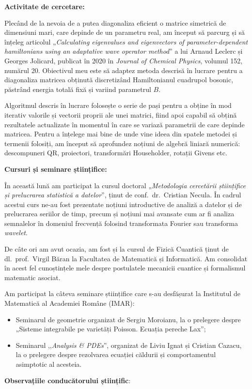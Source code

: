 
\makereportpreamble

\textbf{Activitate de cercetare:}

Plecând de la nevoia de a putea diagonaliza eficient o matrice simetrică de dimensiuni mari, care depinde de un parametru real, am început să parcurg și să înțeleg articolul „\emph{Calculating eigenvalues and eigenvectors of parameter-dependent hamiltonians using an adaptative wave operator method}” a lui Arnaud Leclerc și Georges Jolicard, publicat în 2020 în \emph{Journal of Chemical Physics}, volumul 152, numărul 20. Obiectivul meu este să adaptez metoda descrisă în lucrare pentru a diagonaliza matricea obținută discretizând Hamiltonianul cuadrupol bosonic, păstrând energia totală fixă și variind parametrul \(B\).

Algoritmul descris în lucrare folosește o serie de pași pentru a obține în mod iterativ valorile și vectorii proprii ale unei matrici, fiind apoi capabil să obțină rezultatele actualizate în momentul în care se variază parametrii de care depinde matricea. Pentru a înțelege mai bine de unde vine ideea din spatele metodei și termenii folosiți, am început să aprofundez noțiuni de algebră liniară numerică: descompuneri QR, proiectori, transformări Householder, rotații Givens etc.

\vspace{0.5em}

\textbf{Cursuri și seminare științifice:}

În această lună am participat la cursul doctoral „\emph{Metodologia cercetării științifice și prelucrarea statistică a datelor}”, ținut de conf.\ dr.\ Cristian Necula. În cadrul acestui curs ne-au fost prezentate noțiuni introductive de analiză a datelor și de prelucrarea seriilor de timp, precum și noțiuni mai avansate cum ar fi analiza semnalelor în domeniul frecvență folosind transformata Fourier sau transforma \emph{wavelet}.

De câte ori am avut ocazia, am fost și la cursul de Fizică Cuantică ținut de dl.\ prof.\ Virgil Băran la Facultatea de Matematică și Informatică. Am consolidat în acest fel cunoștințele mele despre postulatele mecanicii cuantice și formalismul matematic asociat.

Am participat la câteva seminare științifice care s-au desfășurat la Institutul de Matematică al Academiei Române (IMAR):
\begin{itemize}
    \item Seminarul de geometrie organizat de Sergiu Moroianu, la o prelegere despre „Sisteme integrabile pe varietăți Poisson. Ecuația pereche Lax”;
    \item Seminarul ,,\emph{Analysis \& PDEs}'', organizat de Liviu Ignat și Cristian Cazacu, la o prelegere despre rezolvarea ecuației căldurii și comportamentul asimptotic al acesteia.
\end{itemize}

\vspace{0.5em}

\textbf{Observațiile conducătorului științific}:

\vspace{3em}

